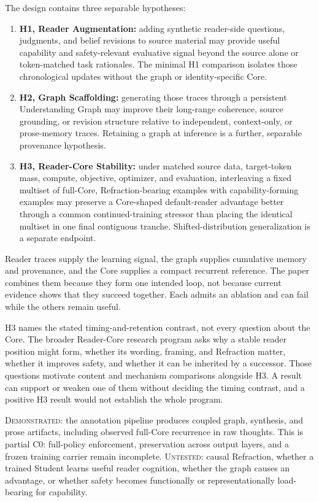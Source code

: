 \documentclass[11pt]{article}
\newcommand{\statusDemonstrated}{\textcolor{implementedGreen}{\textsc{Demonstrated}}}
\newcommand{\statusUntested}{\textcolor{hypothesisBlue}{\textsc{Untested}}}
\begin{document}
The design contains three separable hypotheses:
\begin{enumerate}
    \item \textbf{H1, Reader Augmentation:} adding synthetic reader-side questions, judgments, and belief revisions to source material may provide useful capability and safety-relevant evaluative signal beyond the source alone or token-matched task rationales. The minimal H1 comparison isolates those chronological updates without the graph or identity-specific Core.
    \item \textbf{H2, Graph Scaffolding:} generating those traces through a persistent Understanding Graph may improve their long-range coherence, source grounding, or revision structure relative to independent, context-only, or prose-memory traces. Retaining a graph at inference is a further, separable provenance hypothesis.
    \item \textbf{H3, Reader-Core Stability:} under matched source data, target-token mass, compute, objective, optimizer, and evaluation, interleaving a fixed multiset of full-Core, Refraction-bearing examples with capability-forming examples may preserve a Core-shaped default-reader advantage better through a common continued-training stressor than placing the identical multiset in one final contiguous tranche. Shifted-distribution generalization is a separate endpoint.
\end{enumerate}

Reader traces supply the learning signal, the graph supplies cumulative memory
and provenance, and the Core supplies a compact recurrent reference. The paper
combines them because they form one intended loop, not because current evidence
shows that they succeed together. Each admits an ablation and can fail while the
others remain useful.

H3 names the stated timing-and-retention contrast, not every question about the
Core. The broader Reader-Core research program asks why a stable reader position
might form, whether its wording, framing, and Refraction matter, whether it
improves safety, and whether it can be inherited by a successor. Those questions
motivate content and mechanism comparisons alongside H3. A result can support
or weaken one of them without deciding the timing contrast, and a positive H3
result would not establish the whole program.

\begin{claimbox}
\statusDemonstrated: the annotation pipeline produces coupled graph,
synthesis, and prose artifacts, including observed full-Core recurrence in raw
thoughts. This is partial C0: full-policy enforcement, preservation across
output layers, and a frozen training carrier remain incomplete.
\statusUntested: causal Refraction, whether a trained Student learns useful reader cognition,
whether the graph causes an advantage, or whether safety becomes functionally
or representationally load-bearing for capability.
\end{claimbox}
\end{document}
